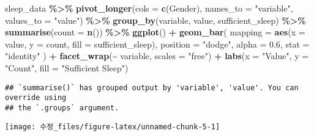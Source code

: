 \documentclass[
  11pt,
]{article}
\newenvironment{Shaded}{\begin{snugshade}}{\end{snugshade}}
\newcommand{\AttributeTok}[1]{\textcolor[rgb]{0.13,0.29,0.53}{#1}}
\newcommand{\FloatTok}[1]{\textcolor[rgb]{0.00,0.00,0.81}{#1}}
\newcommand{\FunctionTok}[1]{\textcolor[rgb]{0.13,0.29,0.53}{\textbf{#1}}}
\newcommand{\NormalTok}[1]{#1}
\newcommand{\SpecialCharTok}[1]{\textcolor[rgb]{0.81,0.36,0.00}{\textbf{#1}}}
\newcommand{\StringTok}[1]{\textcolor[rgb]{0.31,0.60,0.02}{#1}}
\begin{document}
\begin{Shaded}
\begin{Highlighting}[]
\NormalTok{sleep\_data }\SpecialCharTok{\%\textgreater{}\%}
  \FunctionTok{pivot\_longer}\NormalTok{(}\AttributeTok{cols =} \FunctionTok{c}\NormalTok{(Gender), }\AttributeTok{names\_to =} \StringTok{"variable"}\NormalTok{, }\AttributeTok{values\_to =} \StringTok{"value"}\NormalTok{) }\SpecialCharTok{\%\textgreater{}\%}
  \FunctionTok{group\_by}\NormalTok{(variable, value, sufficient\_sleep) }\SpecialCharTok{\%\textgreater{}\%}
  \FunctionTok{summarise}\NormalTok{(}\AttributeTok{count =} \FunctionTok{n}\NormalTok{()) }\SpecialCharTok{\%\textgreater{}\%}
  \FunctionTok{ggplot}\NormalTok{() }\SpecialCharTok{+}
  \FunctionTok{geom\_bar}\NormalTok{(}
    \AttributeTok{mapping =} \FunctionTok{aes}\NormalTok{(}\AttributeTok{x =}\NormalTok{ value, }\AttributeTok{y =}\NormalTok{ count, }\AttributeTok{fill =}\NormalTok{ sufficient\_sleep),}
    \AttributeTok{position =} \StringTok{"dodge"}\NormalTok{,  }
    \AttributeTok{alpha =} \FloatTok{0.6}\NormalTok{,}
    \AttributeTok{stat =} \StringTok{"identity"}
\NormalTok{  ) }\SpecialCharTok{+}
  \FunctionTok{facet\_wrap}\NormalTok{(}\SpecialCharTok{\textasciitilde{}}\NormalTok{ variable, }\AttributeTok{scales =} \StringTok{"free"}\NormalTok{) }\SpecialCharTok{+}
  \FunctionTok{labs}\NormalTok{(}\AttributeTok{x =} \StringTok{"Value"}\NormalTok{, }\AttributeTok{y =} \StringTok{"Count"}\NormalTok{, }\AttributeTok{fill =} \StringTok{"Sufficient Sleep"}\NormalTok{)}
\end{Highlighting}
\end{Shaded}

\begin{verbatim}
## `summarise()` has grouped output by 'variable', 'value'. You can override using
## the `.groups` argument.
\end{verbatim}

\begin{center}\texttt{[image: 수정\_files/figure-latex/unnamed-chunk-5-1]} \end{center}
\end{document}

